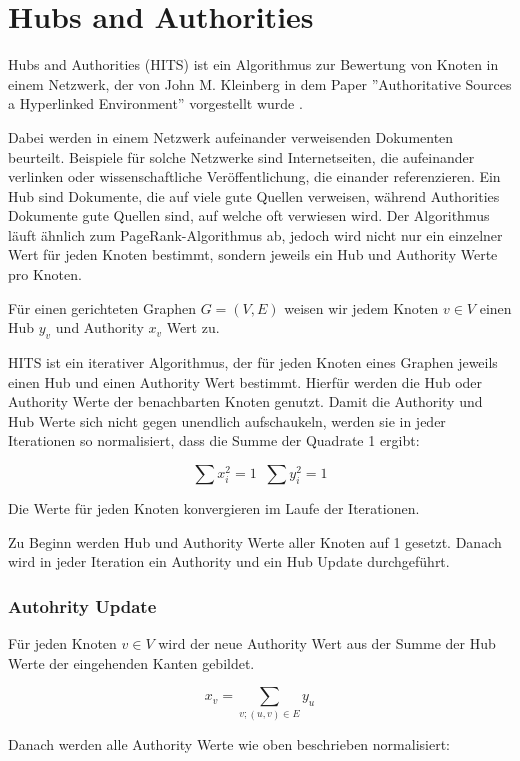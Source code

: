 \section{Hubs and Authorities}
\label{hits}

Hubs and Authorities (HITS) ist ein Algorithmus zur Bewertung von Knoten in einem Netzwerk, der von John M. Kleinberg in dem Paper ''Authoritative Sources a Hyperlinked Environment'' vorgestellt wurde \cite{Kleinberg98authoritativesources}.

Dabei werden in einem Netzwerk aufeinander verweisenden Dokumenten beurteilt. Beispiele für solche Netzwerke sind Internetseiten, die aufeinander
verlinken oder wissenschaftliche Veröffentlichung, die einander referenzieren. Ein Hub sind Dokumente, die auf viele gute Quellen verweisen, während
Authorities Dokumente gute Quellen sind, auf welche oft verwiesen wird. Der Algorithmus läuft ähnlich zum PageRank-Algorithmus ab, 
jedoch wird nicht nur ein einzelner Wert für jeden Knoten bestimmt, sondern jeweils ein Hub und Authority Werte pro Knoten.

Für einen gerichteten Graphen $G = (V, E)$ weisen wir jedem Knoten $v \in V$ einen Hub $y_{v}$ und Authority $x_{v}$ Wert zu.

HITS ist ein iterativer Algorithmus, der für jeden Knoten eines Graphen jeweils einen Hub und einen Authority Wert bestimmt. Hierfür 
werden die Hub oder Authority Werte der benachbarten Knoten genutzt. Damit die Authority und Hub Werte sich nicht gegen
unendlich aufschaukeln, werden sie in jeder Iterationen so normalisiert, dass die Summe der Quadrate 1 ergibt:

\[ \sum x_{i}^{2} = 1 \; \; \sum y_{i}^{2} = 1 \]

Die Werte für jeden Knoten konvergieren im Laufe der Iterationen.

Zu Beginn werden Hub und Authority Werte aller Knoten auf 1 gesetzt. Danach wird in jeder Iteration ein Authority und ein Hub Update durchgeführt.
\subsubsection{Autohrity Update}

Für jeden Knoten $ v \in V $ wird der neue Authority Wert aus der Summe der Hub Werte der eingehenden Kanten gebildet.

\[ x_{v} = \sum_{v; (u, v) \in E} y_{u} \]

Danach werden alle Authority Werte wie oben beschrieben normalisiert:

